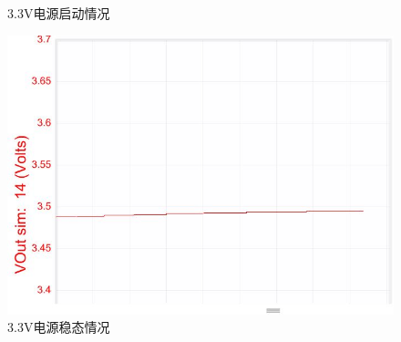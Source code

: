\documentclass[a4paper]{paper}
\begin{document}
\begin{multicols}{2}
\begin{figure}[H]
        \caption{3.3V电源启动情况}
    \end{figure}
    \begin{figure}[H]
        \centering
        \includegraphics[width = 0.8\columnwidth]{../preview/3sim2.jpg}
        \caption{3.3V电源稳态情况}
    \end{figure}
\end{multicols}
\end{document}
